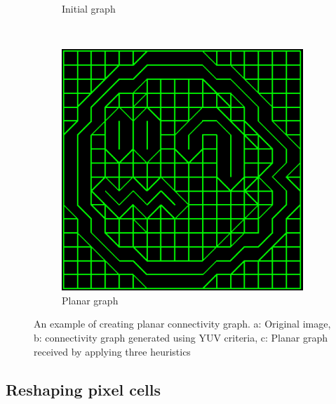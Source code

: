 \documentclass{article}
\begin{document}
\begin{figure}
\begin{subfigure}[b]{0.3\textwidth}
        \caption{Initial graph}
        \label{fig:tiger}
    \end{subfigure}
    ~ %
    \begin{subfigure}[b]{0.3\textwidth}
        \includegraphics[width=\textwidth]{1}
        \caption{Planar graph}
        \label{fig:mouse}
    \end{subfigure}
    \caption{An example of creating planar connectivity graph. a: Original image, b: connectivity graph generated using YUV criteria, c: Planar graph received by applying three heuristics}\label{fig:animals}
\end{figure}

\subsection{Reshaping pixel cells}
\end{document}
